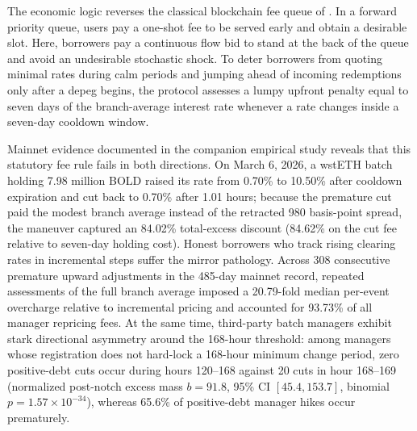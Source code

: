 The economic logic reverses the classical blockchain fee queue of \citet{huberman2021monopoly}. In a forward priority queue, users pay a one-shot fee to be served early and obtain a desirable slot. Here, borrowers pay a continuous flow bid to stand at the back of the queue and avoid an undesirable stochastic shock. To deter borrowers from quoting minimal rates during calm periods and jumping ahead of incoming redemptions only after a depeg begins, the protocol assesses a lumpy upfront penalty equal to seven days of the branch-average interest rate whenever a rate changes inside a seven-day cooldown window.

Mainnet evidence documented in the companion empirical study \citep{companion2026} reveals that this statutory fee rule fails in both directions. On March 6, 2026, a wstETH batch holding 7.98 million BOLD raised its rate from 0.70\% to 10.50\% after cooldown expiration and cut back to 0.70\% after 1.01 hours; because the premature cut paid the modest branch average instead of the retracted 980 basis-point spread, the maneuver captured an 84.02\% total-excess discount (84.62\% on the cut fee relative to seven-day holding cost). Honest borrowers who track rising clearing rates in incremental steps suffer the mirror pathology. Across 308 consecutive premature upward adjustments in the 485-day mainnet record, repeated assessments of the full branch average imposed a 20.79-fold median per-event overcharge relative to incremental pricing and accounted for 93.73\% of all manager repricing fees. At the same time, third-party batch managers exhibit stark directional asymmetry around the 168-hour threshold: among managers whose registration does not hard-lock a 168-hour minimum change period, zero positive-debt cuts occur during hours 120--168 against 20 cuts in hour 168--169 (normalized post-notch excess mass $b = 91.8$, 95\% CI $[45.4, 153.7]$, binomial $p = 1.57 \times 10^{-34}$), whereas 65.6\% of positive-debt manager hikes occur prematurely.

